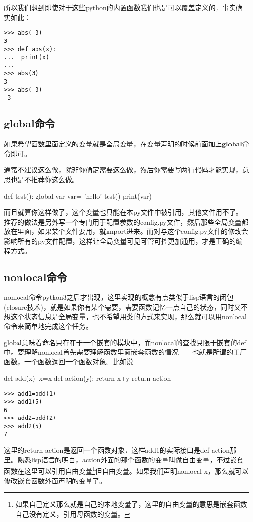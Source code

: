 \documentclass[12pt,oneside]{book}
\begin{document}
\begin{common-format}
所以我们想到即使对于这些python的内置函数我们也是可以覆盖定义的，事实确实如此：
\begin{Verbatim}
>>> abs(-3)
3
>>> def abs(x):
...  print(x)
... 
>>> abs(3)
3
>>> abs(-3)
-3
\end{Verbatim}


\subsection{global命令}
如果希望函数里面定义的变量就是全局变量，在变量声明的时候前面加上\textbf{global}命令即可。

通常不建议这么做，除非你确定需要这么做，然后你需要写两行代码才能实现，意思也是不推荐你这么做。
\begin{tcbpython}
def test():
    global var
    var= 'hello'
test()
print(var)
\end{tcbpython}

而且就算你这样做了，这个变量也只能在本py文件中被引用，其他文件用不了。推荐的做法是另外写一个专门用于配置参数的config.py文件，然后那些全局变量都放在里面，如果某个文件要用，就import进来。而对与这个config.py文件的修改会影响所有的py文件配置，这样让全局变量可见可管可控更加通用，才是正确的编程方式。


\subsection{nonlocal命令}
nonlocal命令python3之后才出现，这里实现的概念有点类似于lisp语言的闭包(closure技术)，就是如果你有某个需要，需要函数记忆一点自己的状态，同时又不想这个状态信息是全局变量，也不希望用类的方式来实现，那么就可以用nonlocal命令来简单地完成这个任务。

global意味着命名只存在于一个嵌套的模块中，而nonlocal的查找只限于嵌套的def中。要理解nonlocal首先需要理解函数里面嵌套函数的情况——也就是所谓的工厂函数，一个函数返回一个函数对象。比如说
\begin{tcbpython}
def add(x):
    x=x
    def action(y):
        return x+y
    return action
\end{tcbpython}
\begin{Verbatim}
>>> add1=add(1)
>>> add1(5)
6
>>> add2=add(2)
>>> add2(5)
7
\end{Verbatim}
这里的return action是返回一个函数对象，这样add1的实际接口是def action那里。熟悉lisp语言的明白，action外面的那个函数的变量叫做自由变量，不过嵌套函数在这里可以引用自由变量\footnote{如果自己定义那么就是自己的本地变量了，这里的自由变量的意思是嵌套函数自己没有定义，引用母函数的变量。}但自由变量。如果我们声明nonlocal x，那么就可以修改嵌套函数外面声明的变量了。


\end{common-format}
\end{document}
